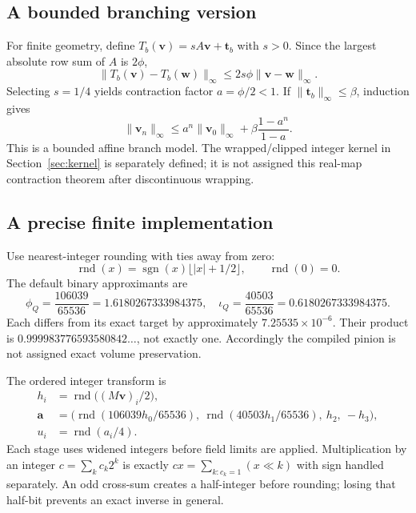 \documentclass[11pt,a4paper]{article}
\newcommand{\round}{\operatorname{rnd}}
\newcommand{\sgn}{\operatorname{sgn}}
\numberwithin{equation}{section}
\begin{document}
\subsection{A bounded branching version}
For finite geometry, define $T_b(\bm v)=sA\bm v+\bm t_b$ with $s>0$. Since the largest absolute row sum of $A$ is $2\phi$,
\begin{equation}
\|T_b(\bm v)-T_b(\bm w)\|_\infty\le 2s\phi\|\bm v-\bm w\|_\infty.
\end{equation}
Selecting $s=1/4$ yields contraction factor $a=\phi/2<1$. If $\|\bm t_b\|_\infty\le\beta$, induction gives
\begin{equation}
\|\bm v_n\|_\infty\le a^n\|\bm v_0\|_\infty+
\beta\frac{1-a^n}{1-a}.
\end{equation}
This is a bounded affine branch model. The wrapped/clipped integer kernel in Section~\ref{sec:kernel} is separately defined; it is not assigned this real-map contraction theorem after discontinuous wrapping.

\subsection{A precise finite implementation}
Use nearest-integer rounding with ties away from zero:
\begin{equation}
\round(x)=\sgn(x)\lfloor |x|+1/2\rfloor,\qquad\round(0)=0.
\end{equation}
The default binary approximants are
\begin{equation}
\phi_Q=\frac{106039}{65536}=1.6180267333984375,
\quad \iota_Q=\frac{40503}{65536}=0.6180267333984375.
\end{equation}
Each differs from its exact target by approximately $7.25535\times10^{-6}$. Their product is $0.999983776593580842\ldots$, not exactly one. Accordingly the compiled pinion is not assigned exact volume preservation.

The ordered integer transform is
\begin{align}
h_i&=\round\bigl((M\bm v)_i/2\bigr),\\
\bm a&=\bigl(\round(106039h_0/65536),\ \round(40503h_1/65536),\ h_2,\ -h_3\bigr),\\
u_i&=\round(a_i/4).
\label{eq:integerpinion}
\end{align}
Each stage uses widened integers before field limits are applied. Multiplication by an integer $c=\sum_kc_k2^k$ is exactly $cx=\sum_{k:c_k=1}(x\ll k)$ with sign handled separately. An odd cross-sum creates a half-integer before rounding; losing that half-bit prevents an exact inverse in general.
\end{document}
